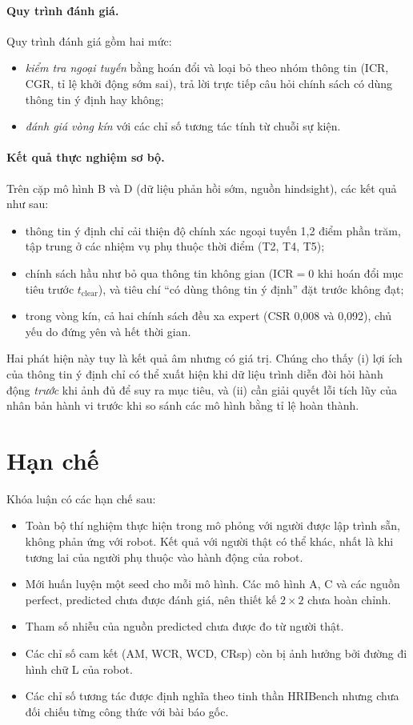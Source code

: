 \paragraph{Quy trình đánh giá.} Quy trình đánh giá gồm hai mức:
\begin{itemize}
  \item \emph{kiểm tra ngoại tuyến} bằng hoán đổi và loại bỏ theo nhóm thông tin (ICR, CGR, tỉ lệ khởi động sớm sai), trả lời trực tiếp câu hỏi chính sách có dùng thông tin ý định hay không;
  \item \emph{đánh giá vòng kín} với các chỉ số tương tác tính từ chuỗi sự kiện.
\end{itemize}

\paragraph{Kết quả thực nghiệm sơ bộ.} Trên cặp mô hình B và D (dữ liệu phản hồi sớm, nguồn hindsight), các kết quả như sau:
\begin{itemize}
  \item thông tin ý định chỉ cải thiện độ chính xác ngoại tuyến 1,2 điểm phần trăm, tập trung ở các nhiệm vụ phụ thuộc thời điểm (T2, T4, T5);
  \item chính sách hầu như bỏ qua thông tin không gian ($\text{ICR} = 0$ khi hoán đổi mục tiêu trước $t_\text{clear}$), và tiêu chí ``có dùng thông tin ý định'' đặt trước không đạt;
  \item trong vòng kín, cả hai chính sách đều xa expert (CSR 0,008 và 0,092), chủ yếu do đứng yên và hết thời gian.
\end{itemize}
Hai phát hiện này tuy là kết quả âm nhưng có giá trị. Chúng cho thấy (i) lợi ích của thông tin ý định chỉ có thể xuất hiện khi dữ liệu trình diễn đòi hỏi hành động \emph{trước} khi ảnh đủ để suy ra mục tiêu, và (ii) cần giải quyết lỗi tích lũy của nhân bản hành vi trước khi so sánh các mô hình bằng tỉ lệ hoàn thành.

\section{Hạn chế}

Khóa luận có các hạn chế sau:
\begin{itemize}
  \item Toàn bộ thí nghiệm thực hiện trong mô phỏng với người được lập trình sẵn, không phản ứng với robot. Kết quả với người thật có thể khác, nhất là khi tương lai của người phụ thuộc vào hành động của robot.
  \item Mới huấn luyện một seed cho mỗi mô hình. Các mô hình A, C và các nguồn perfect, predicted chưa được đánh giá, nên thiết kế $2\times2$ chưa hoàn chỉnh.
  \item Tham số nhiễu của nguồn predicted chưa được đo từ người thật.
  \item Các chỉ số cam kết (AM, WCR, WCD, CRsp) còn bị ảnh hưởng bởi đường đi hình chữ L của robot.
  \item Các chỉ số tương tác được định nghĩa theo tinh thần HRIBench nhưng chưa đối chiếu từng công thức với bài báo gốc.
\end{itemize}

